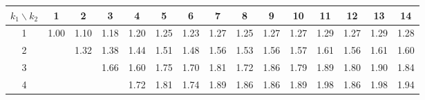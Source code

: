 \documentclass[a4paper, 11pt, ngerman]{article}
\theoremstyle{definition}
\theoremstyle{plain}
\theoremstyle{remark}
\begin{document}
\begin{figure}
    \vspace{2em}

    \small

    \begin{tabular}{c|cccccccccccccc}
        $k_1 \backslash k_2$ & 1                                & 2                                & 3                                & 4                                & 5                                & 6                                & 7                                & 8                                & 9                                & 10                               & 11                               & 12                               & 13                               & 14                               \\
        \hline
        1                    & \textcolor[HTML]{ 0020ff }{1.00} & \textcolor[HTML]{ 0b20f3 }{1.10} & \textcolor[HTML]{ 1520e9 }{1.18} & \textcolor[HTML]{ 1720e7 }{1.20} & \textcolor[HTML]{ 1d20e1 }{1.25} & \textcolor[HTML]{ 1b20e3 }{1.23} & \textcolor[HTML]{ 1f20df }{1.27} & \textcolor[HTML]{ 1d20e1 }{1.25} & \textcolor[HTML]{ 2020de }{1.27} & \textcolor[HTML]{ 2020de }{1.27} & \textcolor[HTML]{ 2220dc }{1.29} & \textcolor[HTML]{ 2020de }{1.27} & \textcolor[HTML]{ 2220dc }{1.29} & \textcolor[HTML]{ 2120dd }{1.28} \\
        2                    &                                  & \textcolor[HTML]{ 2520d9 }{1.32} & \textcolor[HTML]{ 2c20d2 }{1.38} & \textcolor[HTML]{ 3320cb }{1.44} & \textcolor[HTML]{ 3c20c2 }{1.51} & \textcolor[HTML]{ 3820c6 }{1.48} & \textcolor[HTML]{ 4120bd }{1.56} & \textcolor[HTML]{ 3f20bf }{1.53} & \textcolor[HTML]{ 4120bd }{1.56} & \textcolor[HTML]{ 4320bb }{1.57} & \textcolor[HTML]{ 4720b7 }{1.61} & \textcolor[HTML]{ 4120bd }{1.56} & \textcolor[HTML]{ 4720b7 }{1.61} & \textcolor[HTML]{ 4620b8 }{1.60} \\
        3                    &                                  &                                  & \textcolor[HTML]{ 4d20b1 }{1.66} & \textcolor[HTML]{ 4720b7 }{1.60} & \textcolor[HTML]{ 5820a6 }{1.75} & \textcolor[HTML]{ 5220ac }{1.70} & \textcolor[HTML]{ 5f209f }{1.81} & \textcolor[HTML]{ 5520a9 }{1.72} & \textcolor[HTML]{ 652099 }{1.86} & \textcolor[HTML]{ 5d20a1 }{1.79} & \textcolor[HTML]{ 692095 }{1.89} & \textcolor[HTML]{ 5e20a0 }{1.80} & \textcolor[HTML]{ 6a2094 }{1.90} & \textcolor[HTML]{ 63209b }{1.84} \\
        4                    &                                  &                                  &                                  & \textcolor[HTML]{ 5520a9 }{1.72} & \textcolor[HTML]{ 5f209f }{1.81} & \textcolor[HTML]{ 5620a8 }{1.74} & \textcolor[HTML]{ 692095 }{1.89} & \textcolor[HTML]{ 652099 }{1.86} & \textcolor[HTML]{ 652099 }{1.86} & \textcolor[HTML]{ 692095 }{1.89} & \textcolor[HTML]{ 73208b }{1.98} & \textcolor[HTML]{ 652099 }{1.86} & \textcolor[HTML]{ 74208a }{1.98} & \textcolor[HTML]{ 6f208f }{1.94} \\

\end{tabular}
\end{figure}
\end{document}
